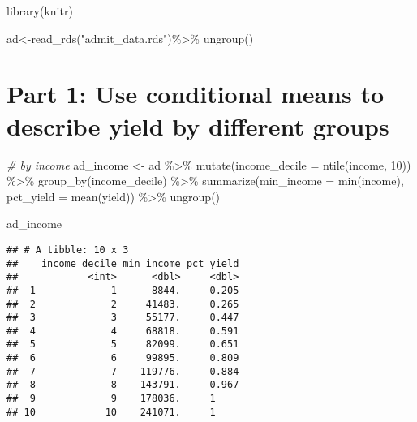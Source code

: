\documentclass[
]{article}
\newenvironment{Shaded}{\begin{snugshade}}{\end{snugshade}}
\newcommand{\AttributeTok}[1]{\textcolor[rgb]{0.77,0.63,0.00}{#1}}
\newcommand{\CommentTok}[1]{\textcolor[rgb]{0.56,0.35,0.01}{\textit{#1}}}
\newcommand{\DecValTok}[1]{\textcolor[rgb]{0.00,0.00,0.81}{#1}}
\newcommand{\FunctionTok}[1]{\textcolor[rgb]{0.00,0.00,0.00}{#1}}
\newcommand{\NormalTok}[1]{#1}
\newcommand{\OtherTok}[1]{\textcolor[rgb]{0.56,0.35,0.01}{#1}}
\newcommand{\SpecialCharTok}[1]{\textcolor[rgb]{0.00,0.00,0.00}{#1}}
\newcommand{\StringTok}[1]{\textcolor[rgb]{0.31,0.60,0.02}{#1}}
\begin{document}
\begin{Shaded}
\begin{Highlighting}[]
\FunctionTok{library}\NormalTok{(knitr)}
\end{Highlighting}
\end{Shaded}

\begin{Shaded}
\begin{Highlighting}[]
\NormalTok{ad}\OtherTok{\textless{}{-}}\FunctionTok{read\_rds}\NormalTok{(}\StringTok{"admit\_data.rds"}\NormalTok{)}\SpecialCharTok{\%\textgreater{}\%}
  \FunctionTok{ungroup}\NormalTok{()}
\end{Highlighting}
\end{Shaded}

\hypertarget{part-1-use-conditional-means-to-describe-yield-by-different-groups}{%
\section{Part 1: Use conditional means to describe yield by different
groups}\label{part-1-use-conditional-means-to-describe-yield-by-different-groups}}

\begin{Shaded}
\begin{Highlighting}[]
\CommentTok{\# by income}
\NormalTok{ad\_income }\OtherTok{\textless{}{-}}\NormalTok{ ad }\SpecialCharTok{\%\textgreater{}\%}
  \FunctionTok{mutate}\NormalTok{(}\AttributeTok{income\_decile =} \FunctionTok{ntile}\NormalTok{(income, }\DecValTok{10}\NormalTok{)) }\SpecialCharTok{\%\textgreater{}\%}
  \FunctionTok{group\_by}\NormalTok{(income\_decile) }\SpecialCharTok{\%\textgreater{}\%}
  \FunctionTok{summarize}\NormalTok{(}\AttributeTok{min\_income =} \FunctionTok{min}\NormalTok{(income),}
            \AttributeTok{pct\_yield =} \FunctionTok{mean}\NormalTok{(yield)) }\SpecialCharTok{\%\textgreater{}\%}
  \FunctionTok{ungroup}\NormalTok{()}

\NormalTok{ad\_income}
\end{Highlighting}
\end{Shaded}

\begin{verbatim}
## # A tibble: 10 x 3
##    income_decile min_income pct_yield
##            <int>      <dbl>     <dbl>
##  1             1      8844.     0.205
##  2             2     41483.     0.265
##  3             3     55177.     0.447
##  4             4     68818.     0.591
##  5             5     82099.     0.651
##  6             6     99895.     0.809
##  7             7    119776.     0.884
##  8             8    143791.     0.967
##  9             9    178036.     1    
## 10            10    241071.     1
\end{verbatim}
\end{document}
